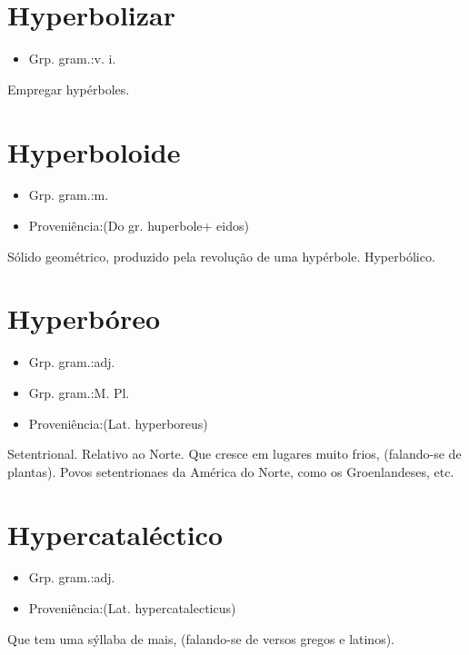 \documentclass{article}
\begin{document}
\section{Hyperbolizar}
\begin{itemize}
\item {Grp. gram.:v. i.}
\end{itemize}
Empregar hypérboles.
\section{Hyperboloide}
\begin{itemize}
\item {Grp. gram.:m.}
\end{itemize}
\begin{itemize}
\item {Proveniência:(Do gr. \textunderscore huperbole\textunderscore  + \textunderscore eidos\textunderscore )}
\end{itemize}
Sólido geométrico, produzido pela revolução de uma hypérbole.
Hyperbólico.
\section{Hyperbóreo}
\begin{itemize}
\item {Grp. gram.:adj.}
\end{itemize}
\begin{itemize}
\item {Grp. gram.:M. Pl.}
\end{itemize}
\begin{itemize}
\item {Proveniência:(Lat. \textunderscore hyperboreus\textunderscore )}
\end{itemize}
Setentrional.
Relativo ao Norte.
Que cresce em lugares muito frios, (falando-se de plantas).
Povos setentrionaes da América do Norte, como os Groenlandeses, etc.
\section{Hypercataléctico}
\begin{itemize}
\item {Grp. gram.:adj.}
\end{itemize}
\begin{itemize}
\item {Proveniência:(Lat. \textunderscore hypercatalecticus\textunderscore )}
\end{itemize}
Que tem uma sýllaba de mais, (falando-se de versos gregos e latinos).
\end{document}
